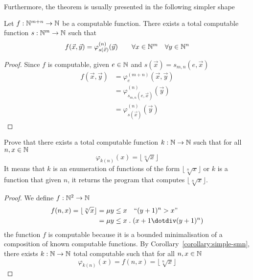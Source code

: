 Furthermore, the theorem is usually presented
in the following simpler shape
\begin{corollary}\label{corollary:simple-smn}
  Let $f: \mathbb{N}^{m+n} \rightarrow \mathbb{N}$ be a computable function. There
  exists a total computable function $s: \mathbb{N}^m\rightarrow \mathbb{N}$ such that
  \[
    f(\vec{x}, \vec{y}) = \varphi_{s(\vec{x})}^{(n)}(\vec{y}) \quad \quad
    \forall x \in \mathbb{N}^m \quad \forall y \in \mathbb{N}^n
  \]
  \begin{proof}
    Since $f$ is computable, given $e \in \mathbb{N}$ and $s(\vec{x}) = s_{m,n}(e, \vec{x})$
    \begin{align*}
      f(\vec{x}, \vec{y}) &= \varphi_e^{(m+n)}(\vec{x}, \vec{y}) \\
      &= \varphi_{s_{m,n}(e, \vec{x})}^{(n)}(\vec{y})\\
      &= \varphi_{s(\vec{x})}^{(n)}(\vec{y})
    \end{align*}
  \end{proof}
\end{corollary}

\begin{example}
  Prove that there exists a total computable function $k : \mathbb{N} \to \mathbb{N}$ such that
  for all $n, x \in \mathbb{N}$
  \[
    \varphi_{k(n)}(x) = \lfloor \sqrt[n]{x} \rfloor
  \]
  It means that $k$ is an enumeration of functions of the form
  $\lfloor \sqrt[n]{x} \rfloor$ or $k$ is a function that given
  $n$, it returns the program that computes $\lfloor \sqrt[n]{x}
  \rfloor$.
\begin{proof}
  We define $f : \mathbb{N}^2 \to \mathbb{N}$
\begin{align*}
  f(n,x) = \lfloor \sqrt[n]{x} \rfloor &= \mu y \leq x \quad \mbox{``}(y+1)^n > x\mbox{''} \\
      &= \mu y \leq x \; . \; (x+1 \dotdiv (y+1)^n)
\end{align*}
  the function $f$ is computable because it is a bounded minimalisation of a composition of known computable functions.
  By Corollary~\ref{corollary:simple-smn}, there exists $k: \mathbb{N} \to \mathbb{N}$ total computable such that for all $n, x \in \mathbb{N}$
  \[
    \varphi_{k(n)}(x) = f(n,x) = \lfloor \sqrt[n]{x} \rfloor
  \]
\end{proof}
\end{example}

